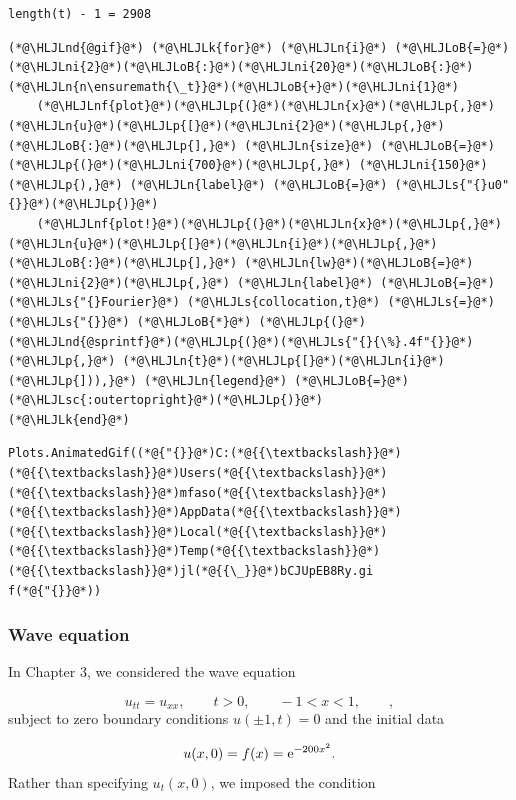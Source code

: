 \documentclass[12pt,a4paper]{article}
\newcommand{\HLJLk}[1]{\textcolor[RGB]{148,91,176}{\textbf{#1}}}
\newcommand{\HLJLn}[1]{#1}
\newcommand{\HLJLnd}[1]{\textcolor[RGB]{214,102,97}{#1}}
\newcommand{\HLJLnf}[1]{\textcolor[RGB]{66,102,213}{#1}}
\newcommand{\HLJLs}[1]{\textcolor[RGB]{201,61,57}{#1}}
\newcommand{\HLJLsc}[1]{\textcolor[RGB]{201,61,57}{#1}}
\newcommand{\HLJLni}[1]{\textcolor[RGB]{59,151,46}{#1}}
\newcommand{\HLJLoB}[1]{\textcolor[RGB]{102,102,102}{\textbf{#1}}}
\newcommand{\HLJLp}[1]{#1}
\begin{document}
\begin{lstlisting}
length(t) - 1 = 2908
\end{lstlisting}


\begin{lstlisting}
(*@\HLJLnd{@gif}@*) (*@\HLJLk{for}@*) (*@\HLJLn{i}@*) (*@\HLJLoB{=}@*) (*@\HLJLni{2}@*)(*@\HLJLoB{:}@*)(*@\HLJLni{20}@*)(*@\HLJLoB{:}@*)(*@\HLJLn{n\ensuremath{\_t}}@*)(*@\HLJLoB{+}@*)(*@\HLJLni{1}@*)
    (*@\HLJLnf{plot}@*)(*@\HLJLp{(}@*)(*@\HLJLn{x}@*)(*@\HLJLp{,}@*) (*@\HLJLn{u}@*)(*@\HLJLp{[}@*)(*@\HLJLni{2}@*)(*@\HLJLp{,}@*)(*@\HLJLoB{:}@*)(*@\HLJLp{],}@*) (*@\HLJLn{size}@*) (*@\HLJLoB{=}@*) (*@\HLJLp{(}@*)(*@\HLJLni{700}@*)(*@\HLJLp{,}@*) (*@\HLJLni{150}@*)(*@\HLJLp{),}@*) (*@\HLJLn{label}@*) (*@\HLJLoB{=}@*) (*@\HLJLs{"{}u0"{}}@*)(*@\HLJLp{)}@*)
    (*@\HLJLnf{plot!}@*)(*@\HLJLp{(}@*)(*@\HLJLn{x}@*)(*@\HLJLp{,}@*) (*@\HLJLn{u}@*)(*@\HLJLp{[}@*)(*@\HLJLn{i}@*)(*@\HLJLp{,}@*)(*@\HLJLoB{:}@*)(*@\HLJLp{],}@*) (*@\HLJLn{lw}@*)(*@\HLJLoB{=}@*)(*@\HLJLni{2}@*)(*@\HLJLp{,}@*) (*@\HLJLn{label}@*) (*@\HLJLoB{=}@*) (*@\HLJLs{"{}Fourier}@*) (*@\HLJLs{collocation,t}@*) (*@\HLJLs{=}@*) (*@\HLJLs{"{}}@*) (*@\HLJLoB{*}@*) (*@\HLJLp{(}@*)(*@\HLJLnd{@sprintf}@*)(*@\HLJLp{(}@*)(*@\HLJLs{"{}{\%}.4f"{}}@*)(*@\HLJLp{,}@*) (*@\HLJLn{t}@*)(*@\HLJLp{[}@*)(*@\HLJLn{i}@*)(*@\HLJLp{])),}@*) (*@\HLJLn{legend}@*) (*@\HLJLoB{=}@*) (*@\HLJLsc{:outertopright}@*)(*@\HLJLp{)}@*)
(*@\HLJLk{end}@*)
\end{lstlisting}

\begin{lstlisting}
Plots.AnimatedGif((*@{"{}}@*)C:(*@{{\textbackslash}}@*)(*@{{\textbackslash}}@*)Users(*@{{\textbackslash}}@*)(*@{{\textbackslash}}@*)mfaso(*@{{\textbackslash}}@*)(*@{{\textbackslash}}@*)AppData(*@{{\textbackslash}}@*)(*@{{\textbackslash}}@*)Local(*@{{\textbackslash}}@*)(*@{{\textbackslash}}@*)Temp(*@{{\textbackslash}}@*)(*@{{\textbackslash}}@*)jl(*@{{\_}}@*)bCJUpEB8Ry.gi
f(*@{"{}}@*))
\end{lstlisting}


\subsubsection{Wave equation}
In Chapter 3, we considered the wave equation

\[
u_{tt} = u_{xx}, \qquad t > 0, \qquad -1 < x < 1, \qquad ,
\]
subject to zero boundary conditions $u(\pm 1, t) = 0$ and the initial data

\[
u(x,0) = f(x) = {\rm e}^{-200x^2}.
\]
Rather than specifying $u_t(x,0)$, we imposed the condition
\end{document}
